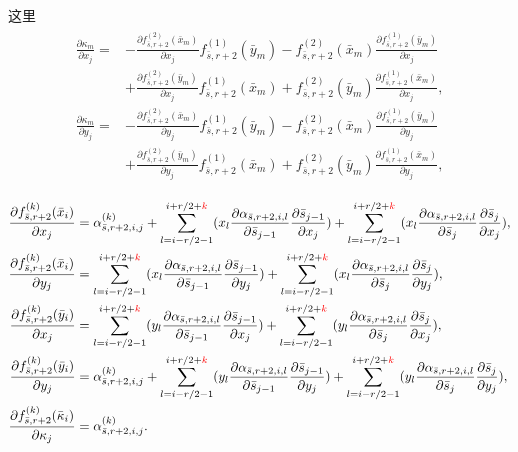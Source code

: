 \documentclass[a4paper,twoside]{ctexart}
\newcommand{\pdfrac}[2]{\frac{\partial #1}{\partial #2}}
\begin{document}
这里
\begin{eqnarray}
  \label{eq:showcalintails1}
  \begin{aligned}
    \pdfrac{\kappa_m}{x_j} =&
    -\pdfrac{f_{\bar{s},r+2}^{(2)}(\bar{x}_m)}{x_j}f_{\bar{s},r+2}^{(1)}(\bar{y}_m)-f_{\bar{s},r+2}^{(2)}(\bar{x}_m)\pdfrac{f_{\bar{s},r+2}^{(1)}(\bar{y}_m)}{x_j}\\
    &+\pdfrac{f_{\bar{s},r+2}^{(2)}(\bar{y}_m)}{x_j}f_{\bar{s},r+2}^{(1)}(\bar{x}_m)+f_{\bar{s},r+2}^{(2)}(\bar{y}_m)\pdfrac{f_{\bar{s},r+2}^{(1)}(\bar{x}_m)}{x_j},\\
    \pdfrac{\kappa_m}{y_j} =&
    -\pdfrac{f_{\bar{s},r+2}^{(2)}(\bar{x}_m)}{y_j}f_{\bar{s},r+2}^{(1)}(\bar{y}_m)-f_{\bar{s},r+2}^{(2)}(\bar{x}_m)\pdfrac{f_{\bar{s},r+2}^{(1)}(\bar{y}_m)}{y_j}\\
    &+\pdfrac{f_{\bar{s},r+2}^{(2)}(\bar{y}_m)}{y_j}f_{\bar{s},r+2}^{(1)}(\bar{x}_m)+f_{\bar{s},r+2}^{(2)}(\bar{y}_m)\pdfrac{f_{\bar{s},r+2}^{(1)}(\bar{x}_m)}{y_j},\\
  \end{aligned}
\end{eqnarray}
\begin{eqnarray}
  \label{eq:showcalintails2}
  \begin{aligned}
    \pdfrac{f_{\bar{s},r+2}^{(k)}(\bar{x}_i)}{x_j} &=
    \alpha_{\bar{s},r+2,i,j}^{(k)} +
    \sum_{l=i-r/2-1}^{i+r/2+\textcolor{red}{k}}(x_l\pdfrac{\alpha_{\bar{s},r+2,i,l}}{\bar{s}_{j-1}}\pdfrac{\bar{s}_{j-1}}{x_j})
    +
    \sum_{l=i-r/2-1}^{i+r/2+\textcolor{red}{k}}(x_l\pdfrac{\alpha_{\bar{s},r+2,i,l}}{\bar{s}_{j}}\pdfrac{\bar{s}_{j}}{x_j}),\\
    \pdfrac{f_{\bar{s},r+2}^{(k)}(\bar{x}_i)}{y_j} &=
    \sum_{l=i-r/2-1}^{i+r/2+\textcolor{red}{k}}(x_l\pdfrac{\alpha_{\bar{s},r+2,i,l}}{\bar{s}_{j-1}}\pdfrac{\bar{s}_{j-1}}{y_j})
    +
    \sum_{l=i-r/2-1}^{i+r/2+\textcolor{red}{k}}(x_l\pdfrac{\alpha_{\bar{s},r+2,i,l}}{\bar{s}_{j}}\pdfrac{\bar{s}_{j}}{y_j}),\\
    \pdfrac{f_{\bar{s},r+2}^{(k)}(\bar{y}_i)}{x_j} &=
    \sum_{l=i-r/2-1}^{i+r/2+\textcolor{red}{k}}(y_l\pdfrac{\alpha_{\bar{s},r+2,i,l}}{\bar{s}_{j-1}}\pdfrac{\bar{s}_{j-1}}{x_j})
    +
    \sum_{l=i-r/2-1}^{i+r/2+\textcolor{red}{k}}(y_l\pdfrac{\alpha_{\bar{s},r+2,i,l}}{\bar{s}_{j}}\pdfrac{\bar{s}_{j}}{x_j}),\\
    \pdfrac{f_{\bar{s},r+2}^{(k)}(\bar{y}_i)}{y_j} &=
    \alpha_{\bar{s},r+2,i,j}^{(k)} +
    \sum_{l=i-r/2-1}^{i+r/2+\textcolor{red}{k}}(y_l\pdfrac{\alpha_{\bar{s},r+2,i,l}}{\bar{s}_{j-1}}\pdfrac{\bar{s}_{j-1}}{y_j})
    +
    \sum_{l=i-r/2-1}^{i+r/2+\textcolor{red}{k}}(y_l\pdfrac{\alpha_{\bar{s},r+2,i,l}}{\bar{s}_{j}}\pdfrac{\bar{s}_{j}}{y_j}),\\
    \pdfrac{f_{\bar{s},r+2}^{(k)}(\bar{\kappa}_i)}{\kappa_j} &=
    \alpha_{\bar{s},r+2,i,j}^{(k)}
    .\\
  \end{aligned}
\end{eqnarray}
\end{document}

